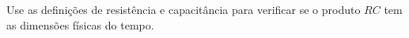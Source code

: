 Use as definições de resistência e capacitância para verificar se o produto $RC$ tem as dimensões físicas do tempo.
